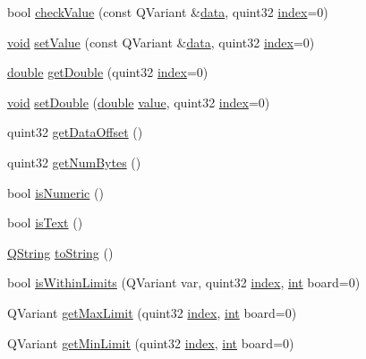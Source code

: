 \begin{DoxyCompactItemize}
bool \hyperlink{group___u_a_v_objects_plugin_ga8aed4e68eb0697d4776a103bfe5aa059}{check\-Value} (const Q\-Variant \&\hyperlink{glext_8h_a8850df0785e6fbcc2351af3b686b8c7a}{data}, quint32 \hyperlink{glext_8h_ab47dd9958bcadea08866b42bf358e95e}{index}=0)
\item 
\hyperlink{group___u_a_v_objects_plugin_ga444cf2ff3f0ecbe028adce838d373f5c}{void} \hyperlink{group___u_a_v_objects_plugin_gab647538e1956252e12841c42a54106c7}{set\-Value} (const Q\-Variant \&\hyperlink{glext_8h_a8850df0785e6fbcc2351af3b686b8c7a}{data}, quint32 \hyperlink{glext_8h_ab47dd9958bcadea08866b42bf358e95e}{index}=0)
\item 
\hyperlink{_super_l_u_support_8h_a8956b2b9f49bf918deed98379d159ca7}{double} \hyperlink{group___u_a_v_objects_plugin_gac189fe8172d3c25a937b7d0106025dfe}{get\-Double} (quint32 \hyperlink{glext_8h_ab47dd9958bcadea08866b42bf358e95e}{index}=0)
\item 
\hyperlink{group___u_a_v_objects_plugin_ga444cf2ff3f0ecbe028adce838d373f5c}{void} \hyperlink{group___u_a_v_objects_plugin_ga6c5e6a55d16226d0cfef0d2f512e243e}{set\-Double} (\hyperlink{_super_l_u_support_8h_a8956b2b9f49bf918deed98379d159ca7}{double} \hyperlink{glext_8h_aa0e2e9cea7f208d28acda0480144beb0}{value}, quint32 \hyperlink{glext_8h_ab47dd9958bcadea08866b42bf358e95e}{index}=0)
\item 
quint32 \hyperlink{group___u_a_v_objects_plugin_gaacffb4e86c637986046b656bb1e8219a}{get\-Data\-Offset} ()
\item 
quint32 \hyperlink{group___u_a_v_objects_plugin_ga872f22445800243679ca0860c3b8b7f1}{get\-Num\-Bytes} ()
\item 
bool \hyperlink{group___u_a_v_objects_plugin_ga5e1a07c1bc278bd1d8f1460ca08d13c7}{is\-Numeric} ()
\item 
bool \hyperlink{group___u_a_v_objects_plugin_ga6ad4eb36bd160d16bccdc494caf60938}{is\-Text} ()
\item 
\hyperlink{group___u_a_v_objects_plugin_gab9d252f49c333c94a72f97ce3105a32d}{Q\-String} \hyperlink{group___u_a_v_objects_plugin_ga149341e646b59250818f980dce9fd601}{to\-String} ()
\item 
bool \hyperlink{group___u_a_v_objects_plugin_gaab4e295f61848873ab0e45b3546a0035}{is\-Within\-Limits} (Q\-Variant var, quint32 \hyperlink{glext_8h_ab47dd9958bcadea08866b42bf358e95e}{index}, \hyperlink{ioapi_8h_a787fa3cf048117ba7123753c1e74fcd6}{int} board=0)
\item 
Q\-Variant \hyperlink{group___u_a_v_objects_plugin_gafbe9b468da7decca7c6ff46202b938ba}{get\-Max\-Limit} (quint32 \hyperlink{glext_8h_ab47dd9958bcadea08866b42bf358e95e}{index}, \hyperlink{ioapi_8h_a787fa3cf048117ba7123753c1e74fcd6}{int} board=0)
\item 
Q\-Variant \hyperlink{group___u_a_v_objects_plugin_ga3f6a930205ce76977ac96ffcfb864a8d}{get\-Min\-Limit} (quint32 \hyperlink{glext_8h_ab47dd9958bcadea08866b42bf358e95e}{index}, \hyperlink{ioapi_8h_a787fa3cf048117ba7123753c1e74fcd6}{int} board=0)
\end{DoxyCompactItemize}
